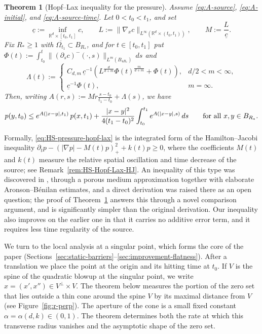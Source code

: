 \documentclass[11pt]{amsart}
\numberwithin{equation}{section}
\numberwithin{figure}{section}
\theoremstyle{plain}
\newtheorem{thm}{Theorem}[section]
\theoremstyle{definition}
\theoremstyle{remark}
\theoremstyle{plain}
\newcommand{\abs}[1]{\lvert #1 \rvert}
\newcommand{\norm}[1]{\lVert #1 \rVert}
\def\R{\mathbb{R}}
\begin{document}
\begin{thm}[Hopf--Lax inequality for the pressure]\label{prop:HS-pressure-hopf-lax}
Assume \eqref{eq:A-source}, \eqref{eq:A-initial}, and \eqref{eq:A-source-time}. Let $0<t_0<t_1$, and set
\begin{equation}\label{eq:HS-Hopf-Lax-cinf-L-M}
    \underline c:=\inf_{\R^d\times[t_0,t_1]}c,\qquad
    L:=\norm{\nabla_xc}_{L^\infty(\R^d\times(t_0,t_1))},\qquad
    M:=\frac{L}{\underline c} .
\end{equation}
Fix $R_*\geq1$ with $\overline{\Omega_{t_1}}\subset B_{R_*}$, and for $t\in[t_0,t_1]$ put
$\Phi(t):=\int_{t_0}^t\norm{(\partial_sc)^-(\cdot,s)}_{L^m(B_{4R_*})}\,ds$ and
\begin{equation}\label{eq:HS-Hopf-Lax-Lambda-q}
    \Lambda(t):=
    \begin{cases}
    \displaystyle
    C_{d,m}\,\underline c^{-1}
    \left(L^{\frac{d}{d+m}}\Phi(t)^{\frac{m}{d+m}}+\Phi(t)\right),
        &d/2<m<\infty,\\[2ex]
    \displaystyle
    \underline c^{-1}\Phi(t),
        &m=\infty .
    \end{cases}
\end{equation}
Then, writing $A(r,s):=Mr\frac{s-t_0}{t_1-t_0}+\Lambda(s)$, we have
\begin{equation}\label{eq:HS-pressure-hopf-lax}
    p(y,t_0)
    \leq
    e^{A(\abs{x-y},t_1)}\,p(x,t_1)
    +\frac{\abs{x-y}^2}{4(t_1-t_0)^2}
    \int_{t_0}^{t_1}e^{A(\abs{x-y},s)}\,ds
    \qquad\hbox{for all }x,y\in B_{R_*}.
\end{equation}
\end{thm}

Formally, \eqref{eq:HS-pressure-hopf-lax} is the integrated form of the Hamilton--Jacobi inequality
$\partial_t p-(\abs{\nabla p}-M(t)p)_+^2+k(t)p\geq0$, where the coefficients $M(t)$ and $k(t)$ measure the
relative spatial oscillation and time decrease of the source; see Remark~\ref{rem:HS-Hopf-Lax-HJ}. An inequality of
this type was discovered in \cite{CJK25}, through a porous medium approximation together    
with elaborate Aronson--B\'enilan estimates, and a direct derivation was raised there as an
open question; the proof of Theorem~\ref{prop:HS-pressure-hopf-lax} answers this through a novel comparison argument, and is significantly simpler than the original derivation. Our inequality also
improves on the earlier one in that it
carries no additive error term, and it requires less time regularity of the source.

We turn to the local analysis at a singular point, which forms the core of the paper
(Sections~\ref{sec:static-barriers}--\ref{sec:improvement-flatness}). After a
translation we place the point at the origin and its hitting time at $t_0$.
If $V$ is the spine of the quadratic blowup at the singular point, we
write $x=(x',x'')\in V^\perp\times V$.
The theorem below measures the portion of the zero set that lies outside a thin
cone around the spine $V$ by its maximal distance from $V$ (see
Figure~\ref{fig:r-perp}). The aperture of the cone is a small fixed constant
$\alpha=\alpha(d,k)\in(0,1)$.
The theorem determines both the rate at which this transverse radius
vanishes and the asymptotic shape of the zero set.
\end{document}

